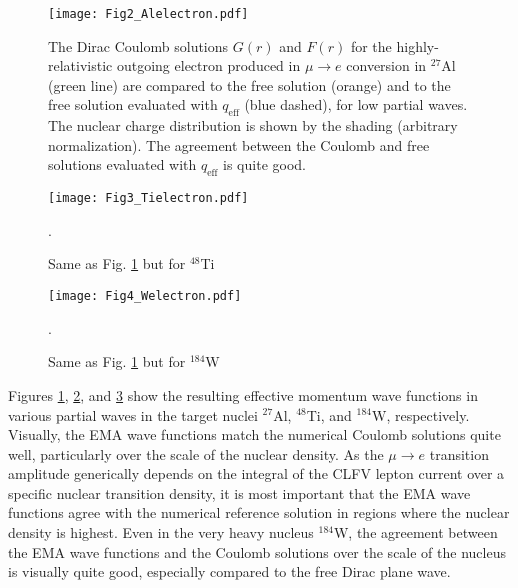 \documentclass{book}[letterpaper,12pt]
\begin{document}
\begin{figure}
\centering
\texttt{[image: Fig2\_Alelectron.pdf]}
\caption{The Dirac Coulomb solutions $G(r)$ and $F(r)$ for the highly-relativistic outgoing electron produced in $\mu\rightarrow e$ conversion in $^{27}$Al (green line) are compared to the free solution (orange) and to the free solution evaluated with $q_\mathrm{eff}$ (blue dashed), for low partial waves. The nuclear charge distribution is shown by the shading (arbitrary normalization). The agreement between the Coulomb and free solutions evaluated with $q_\mathrm{eff}$ is quite good.}
\label{fig:Alelectron}
\end{figure}
\begin{figure}
\centering
\texttt{[image: Fig3\_Tielectron.pdf]}
\caption{Same as Fig. \ref{fig:Alelectron} but for $^{48}$Ti}.
\label{fig:Tielectron}
\end{figure}
\begin{figure}
\centering
\texttt{[image: Fig4\_Welectron.pdf]}
\caption{Same as Fig. \ref{fig:Alelectron} but for $^{184}$W}.
\label{fig:Welectron}
\end{figure}
Figures \ref{fig:Alelectron}, \ref{fig:Tielectron}, and \ref{fig:Welectron} show the resulting effective momentum wave functions in various partial waves in the target nuclei $^{27}$Al, $^{48}$Ti, and $^{184}$W, respectively. Visually, the EMA wave functions match the numerical Coulomb solutions quite well, particularly over the scale of the nuclear density. As the $\mu\rightarrow e$ transition amplitude generically depends on the integral of the CLFV lepton current over a specific nuclear transition density, it is most important that the EMA wave functions agree with the numerical reference solution in regions where the nuclear density is highest. Even in the very heavy nucleus $^{184}$W, the agreement between the EMA wave functions and the Coulomb solutions over the scale of the nucleus is visually quite good, especially compared to the free Dirac plane wave.
\end{document}
